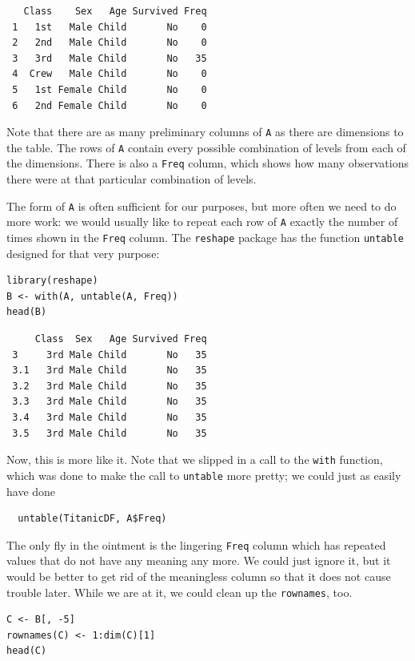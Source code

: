 \documentclass[captions=tableheading]{scrbook}
\begin{document}
\begin{example}
\begin{verbatim}
   Class    Sex   Age Survived Freq
 1   1st   Male Child       No    0
 2   2nd   Male Child       No    0
 3   3rd   Male Child       No   35
 4  Crew   Male Child       No    0
 5   1st Female Child       No    0
 6   2nd Female Child       No    0
\end{verbatim}

Note that there are as many preliminary columns of \texttt{A} as there are dimensions to the table. The rows of \texttt{A} contain every possible combination of levels from each of the dimensions. There is also a \texttt{Freq} column, which shows how many observations there were at that particular combination of levels. 

The form of \texttt{A} is often sufficient for our purposes, but more often we need to do more work: we would usually like to repeat each row of \texttt{A} exactly the number of times shown in the \texttt{Freq} column. The \texttt{reshape} package \cite{Wickhamreshape} has the function \texttt{untable} designed for that very purpose: 


\lstset{language=R}
\begin{lstlisting}
library(reshape)
B <- with(A, untable(A, Freq))
head(B)
\end{lstlisting}

\begin{verbatim}
     Class  Sex   Age Survived Freq
 3     3rd Male Child       No   35
 3.1   3rd Male Child       No   35
 3.2   3rd Male Child       No   35
 3.3   3rd Male Child       No   35
 3.4   3rd Male Child       No   35
 3.5   3rd Male Child       No   35
\end{verbatim}

Now, this is more like it. Note that we slipped in a call to the \texttt{with} function, which was done to make the call to \texttt{untable} more pretty; we could just as easily have done
\begin{verbatim}
  untable(TitanicDF, A$Freq)
\end{verbatim}


The only fly in the ointment is the lingering \texttt{Freq} column which has repeated values that do not have any meaning any more. We could just ignore it, but it would be better to get rid of the meaningless column so that it does not cause trouble later. While we are at it, we could clean up the \texttt{rownames}, too.


\lstset{language=R}
\begin{lstlisting}
C <- B[, -5]
rownames(C) <- 1:dim(C)[1]
head(C)
\end{lstlisting}


\end{example}
\end{document}

